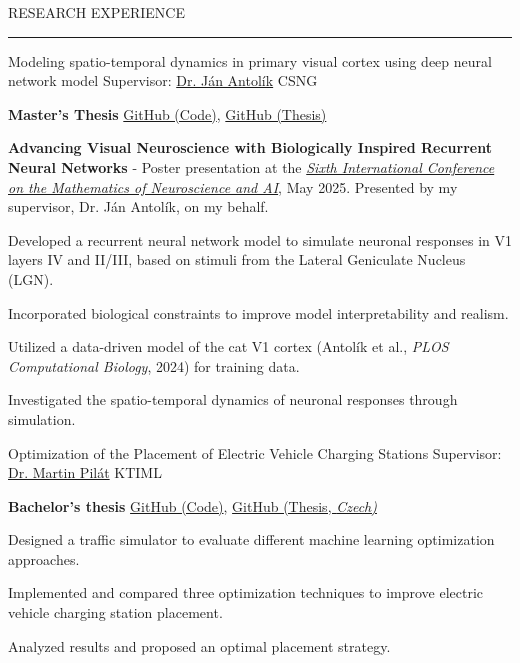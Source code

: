 \documentclass{resume} %
\renewenvironment{rSection}[1]{
\sectionskip
\textcolor{CarnegieMellonRed}{\MakeUppercase{#1}}
\sectionlineskip
\hrule
\begin{list}{}{
\setlength{\leftmargin}{1.5em}
}
\item[]
}{
\end{list}
}
\begin{document}
\begin{rSection}{Research Experience}
\begin{rProject}{\large Modeling spatio-temporal dynamics in primary visual cortex 
using deep neural network model}{}
{Supervisor: \href{https://www.mff.cuni.cz/en/faculty/organizational-structure/people?hdl=11457}
{Dr. Ján Antolík}}
{CSNG}
    \item \textbf{Master’s Thesis} \vline \: 
    \href{https://github.com/dbeinhauer/mcs-source}{GitHub (Code)},
    \href{https://github.com/dbeinhauer/mcs-thesis}{GitHub (Thesis)}
    \item \textbf{Advancing Visual Neuroscience with Biologically Inspired Recurrent Neural Networks} - Poster presentation at the  \href{https://www.neuromonster.org/poster-session-1}{\emph{Sixth International Conference on the Mathematics of Neuroscience and AI}}, May 2025. Presented by my supervisor, Dr. Ján Antolík, on my behalf.
    \item Developed a recurrent neural network model to simulate neuronal responses in V1 layers IV and II/III, based on stimuli from the Lateral Geniculate Nucleus (LGN).
    \item Incorporated biological constraints to improve model interpretability and realism.
    \item Utilized a data-driven model of the cat V1 cortex (Antolík et al., \emph{PLOS Computational Biology}, 2024) for training data.
    \item Investigated the spatio-temporal dynamics of neuronal responses through simulation.
\end{rProject}


\begin{rProject}{\large Optimization of the Placement of Electric Vehicle Charging Stations}{}
{Supervisor: \href{https://www.mff.cuni.cz/en/faculty/organizational-structure/people?hdl=4171}
{Dr. Martin Pilát}}
{KTIML}
    \item \textbf{Bachelor's thesis} \vline \: 
    \href{https://github.com/dbeinhauer/bcs-source}{GitHub (Code)},
    \href{https://github.com/dbeinhauer/bcs-thesis}{GitHub (Thesis, \em Czech)}
    \item Designed a traffic simulator to evaluate different machine learning 
    optimization approaches.
    \item Implemented and compared three optimization techniques to improve 
    electric vehicle charging station placement.
    \item Analyzed results and proposed an optimal placement strategy.
\end{rProject}


\end{rSection}
\end{document}
